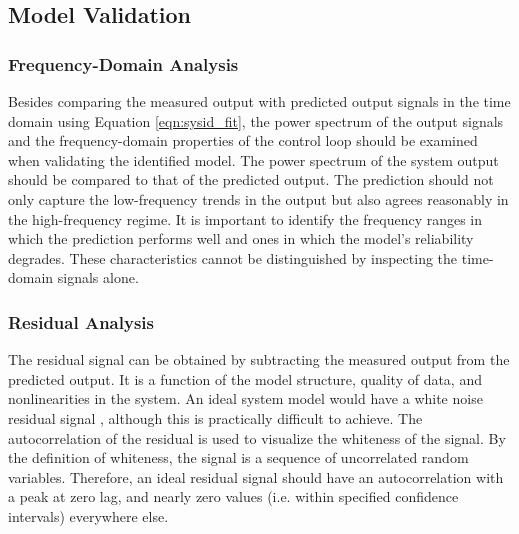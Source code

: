 \subsection{Model Validation} \label{ch:sysid:proc:val}

\subsubsection{Frequency-Domain Analysis}

Besides comparing the measured output with predicted output signals in the time domain using Equation \ref{eqn:sysid_fit}, the power spectrum of the output signals and the frequency-domain properties of the control loop should be examined when validating the identified model. The power spectrum of the system output should be compared to that of the predicted output. The prediction should not only capture the low-frequency trends in the output but also agrees reasonably in the high-frequency regime. It is important to identify the frequency ranges in which the prediction performs well and ones in which the model's reliability degrades. These characteristics cannot be distinguished by inspecting the time-domain signals alone. 

\subsubsection{Residual Analysis}

The residual signal can be obtained by subtracting the measured output from the predicted output. It is a function of the model structure, quality of data, and nonlinearities in the system. An ideal system model would have a white noise residual signal \cite{ljung_ideal_white}, although this is practically difficult to achieve. \cite{nasa_white_residual} The autocorrelation of the residual is used to visualize the whiteness of the signal. By the definition of whiteness, the signal is a sequence of uncorrelated random variables. Therefore, an ideal residual signal should have an autocorrelation with a peak at zero lag, and nearly zero values (i.e. within specified confidence intervals) everywhere else. %



